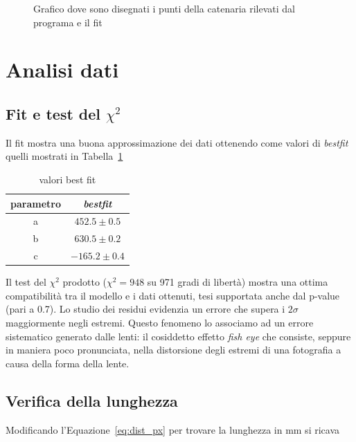 \documentclass[a4paper,12pt]{article}
\begin{document}
\begin{figure}
    \centering
    \resizebox{0.85\textwidth}{!}{%
        
    }
    \caption{Grafico dove sono disegnati i punti della catenaria rilevati dal programa e il fit}%
    \label{fig:fit}
\end{figure}

\section{Analisi dati}

\subsection{Fit e test del $\chi^2$}\label{sec:fit_e_chi2}

Il fit mostra una buona approssimazione dei dati ottenendo come valori di \textit{bestfit} quelli mostrati in Tabella~\ref{tab:best_fit}

\begin{table}[h!]
    \centering
    \begin{tabular}{c|c}
        \toprule
        parametro & \textit{bestfit} \\
        \midrule
        a & $452.5 \pm 0.5$ \\
        b & $630.5 \pm 0.2$ \\
        c & $-165.2 \pm 0.4$ \\
        \bottomrule
    \end{tabular}
    \caption{valori best fit}%
    \label{tab:best_fit}
\end{table}

Il test del $\chi^2$ prodotto ($\chi^2 = 948$ su 971 gradi di libertà) mostra una ottima compatibilità tra il modello e i dati ottenuti, tesi supportata anche dal p-value (pari a 0.7). 
Lo studio dei residui evidenzia un errore che supera i $2\sigma$ maggiormente negli estremi. Questo fenomeno lo associamo ad un errore sistematico generato dalle lenti: il cosiddetto effetto \textit{fish eye} che consiste, seppure in maniera poco pronunciata, nella distorsione degli estremi di una fotografia a causa della forma della lente.

\subsection{Verifica della lunghezza}

Modificando l'Equazione~\ref{eq:dist_px} per trovare la lunghezza in mm si ricava
\end{document}
